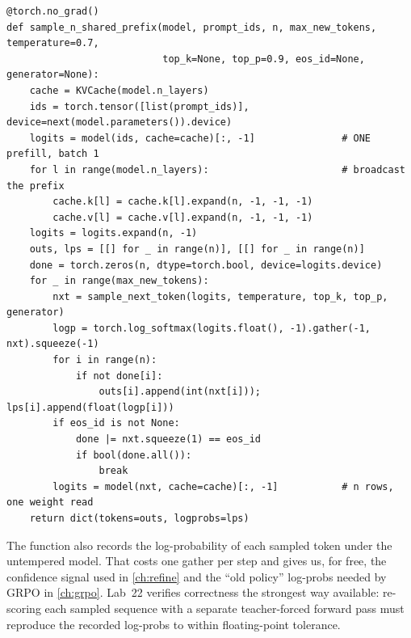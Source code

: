 \begin{lstlisting}[caption={Prefill once, fan out, decode $n$ samples as a batch (\texttt{llmsys/tts.py}).},label={lst:scaling:shared}]
@torch.no_grad()
def sample_n_shared_prefix(model, prompt_ids, n, max_new_tokens, temperature=0.7,
                           top_k=None, top_p=0.9, eos_id=None, generator=None):
    cache = KVCache(model.n_layers)
    ids = torch.tensor([list(prompt_ids)], device=next(model.parameters()).device)
    logits = model(ids, cache=cache)[:, -1]               # ONE prefill, batch 1
    for l in range(model.n_layers):                       # broadcast the prefix
        cache.k[l] = cache.k[l].expand(n, -1, -1, -1)
        cache.v[l] = cache.v[l].expand(n, -1, -1, -1)
    logits = logits.expand(n, -1)
    outs, lps = [[] for _ in range(n)], [[] for _ in range(n)]
    done = torch.zeros(n, dtype=torch.bool, device=logits.device)
    for _ in range(max_new_tokens):
        nxt = sample_next_token(logits, temperature, top_k, top_p, generator)
        logp = torch.log_softmax(logits.float(), -1).gather(-1, nxt).squeeze(-1)
        for i in range(n):
            if not done[i]:
                outs[i].append(int(nxt[i])); lps[i].append(float(logp[i]))
        if eos_id is not None:
            done |= nxt.squeeze(1) == eos_id
            if bool(done.all()):
                break
        logits = model(nxt, cache=cache)[:, -1]           # n rows, one weight read
    return dict(tokens=outs, logprobs=lps)
\end{lstlisting}

The function also records the log-probability of each sampled token under the untempered model.
That costs one gather per step and gives us, for free, the confidence signal used in
\cref{ch:refine} and the ``old policy'' log-probs needed by GRPO in \cref{ch:grpo}. Lab~22 verifies
correctness the strongest way available: re-scoring each sampled sequence with a separate
teacher-forced forward pass must reproduce the recorded log-probs to within floating-point
tolerance.

